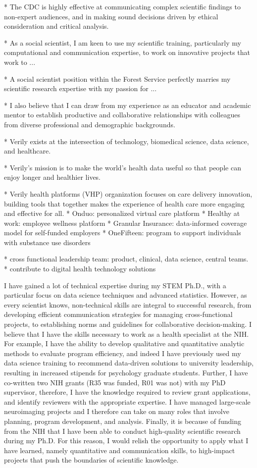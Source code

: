 \documentclass[9pt, a4paper]{maedbh-cv}
\begin{document}
\begin{cvletter}
* The CDC is highly effective at communicating complex scientific findings to non-expert audiences, and in making sound decisions driven by ethical consideration and critical analysis.

* As a social scientist, I am keen to use my scientific training, particularly my computational and communication expertise, to work on innovative projects that work to ...

* A social scientist position within the Forest Service perfectly marries my scientific research expertise with my passion for  ...

* I also believe that I can draw from my experience as an educator and academic mentor to establish productive and collaborative relationships with colleagues from diverse professional and demographic backgrounds. 

* Verily exists at the intersection of technology, biomedical science, data science, and healthcare. 

* Verily's mission is to make the world's health data useful so that people can enjoy longer and healthier lives. 

* Verily health platforms (VHP) organization focuses on care delivery innovation, building tools that together makes the experience of health care more engaging and effective for all. 
* Onduo: personalized virtual care platform
* Healthy at work: employee wellness platform 
* Granular Insurance: data-informed coverage model for self-funded employers
* OneFifteen: program to support individuals with substance use disorders

* cross functional leadership team: product, clinical, data science, central teams. 
* contribute to digital health technology solutions

I have gained a lot of technical expertise during my STEM Ph.D., with a particular focus on data science techniques and advanced statistics. However, as every scientist knows, non-technical skills are integral to successful research, from developing efficient communication strategies for managing cross-functional projects, to establishing norms and guidelines for collaborative decision-making. I believe that I have the skills necessary to work as a health specialist at the NIH. For example, I have the ability to develop qualitative and quantitative analytic methods to evaluate program efficiency, and indeed I have previously used my data science training to recommend data-driven solutions to university leadership, resulting in increased stipends for psychology graduate students. Further, I have co-written two NIH grants (R35 was funded, R01 was not) with my PhD supervisor, therefore, I have the knowledge required to review grant applications, and identify reviewers with the appropriate expertise. I have managed large-scale neuroimaging projects and I therefore can take on many roles that involve planning, program development, and analysis. Finally, it is because of funding from the NIH that I have been able to conduct high-quality scientific research during my Ph.D. For this reason, I would relish the opportunity to apply what I have learned, namely quantitative and communication skills, to high-impact projects that push the boundaries of scientific knowledge.


\end{cvletter}
\end{document}
